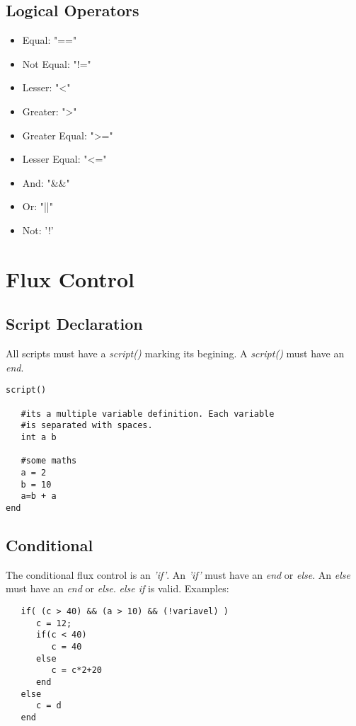 \documentclass[ letterpaper,12pt]{article}
\begin{document}
\subsection{Logical Operators}

\begin{itemize}
\item{Equal: "=="}
\item{Not Equal: "!="}
\item{Lesser: "<"}
\item{Greater: ">"}
\item{Greater Equal: ">="}
\item{Lesser Equal: "<="}
\item{And: "\&\&"}
\item{Or: "||"}
\item{Not: '!'}
\end{itemize}

\section{Flux Control}

\subsection{Script Declaration}

All scripts must have a {\it script()} marking its begining. A {\it script()}
must have an {\it end}.

\begin{verbatim}
script()

   #its a multiple variable definition. Each variable
   #is separated with spaces.
   int a b

   #some maths
   a = 2
   b = 10
   a=b + a
end
\end{verbatim}

\subsection{Conditional}

The conditional flux control is an {\it 'if'}. An {\it 'if'} must have an {\it
end} or {\it else}. An {\it else} must have an {\it end} or {\it else}. {\it
else if} is valid. Examples:

\begin{verbatim}
   if( (c > 40) && (a > 10) && (!variavel) )
      c = 12;
      if(c < 40)
         c = 40
      else
         c = c*2+20
      end
   else
      c = d
   end
\end{verbatim}
\end{document}
